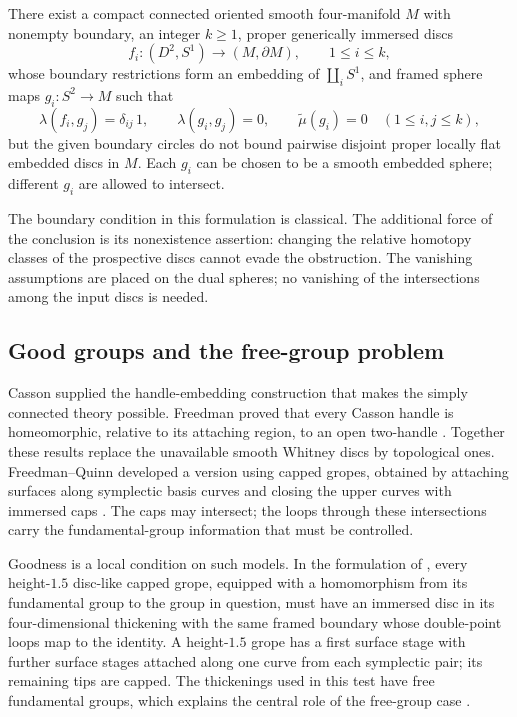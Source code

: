 \begin{theorem}\label{thm:main}
There exist a compact connected oriented smooth four-manifold $M$ with nonempty boundary, an integer $k\geq1$, proper generically immersed discs
\[
 f_i\colon(D^2,S^1)\longrightarrow(M,\partial M),\qquad 1\leq i\leq k,
\]
whose boundary restrictions form an embedding of $\coprod_iS^1$, and framed sphere maps $g_i\colon S^2\to M$ such that
\begin{equation}\label{eq:input-invariants}
 \lambda(f_i,g_j)=\delta_{ij}\,1,\qquad
 \lambda(g_i,g_j)=0,\qquad
 \widetilde\mu(g_i)=0
 \quad(1\leq i,j\leq k),
\end{equation}
but the given boundary circles do not bound pairwise disjoint proper locally flat embedded discs in $M$. Each $g_i$ can be chosen to be a smooth embedded sphere; different $g_i$ are allowed to intersect.
\end{theorem}

The boundary condition in this formulation is classical. The additional
force of the conclusion is its nonexistence assertion: changing the
relative homotopy classes of the prospective discs cannot evade the
obstruction. The vanishing assumptions are placed on the dual spheres;
no vanishing of the intersections among the input discs is needed.

\subsection{Good groups and the free-group problem}

Casson supplied the handle-embedding construction that makes the
simply connected theory possible. Freedman proved that every Casson
handle is homeomorphic, relative to its attaching region, to an open
two-handle \cite[Theorems~3.1 and~1.1]{Freedman1982}. Together these
results replace the unavailable smooth Whitney discs by topological
ones. Freedman--Quinn developed a version using capped gropes, obtained
by attaching surfaces along symplectic basis curves and closing the
upper curves with immersed caps \cite[Chapters~2--5]{FQ1990}.
The caps may intersect; the loops through these intersections carry
the fundamental-group information that must be controlled.

Goodness is a local condition on such models. In the formulation of
\cite[Definition~3.2]{PRT2025}, every height-$1.5$ disc-like capped
grope, equipped with a homomorphism from its fundamental group to the
group in question, must have an immersed disc in its four-dimensional
thickening with the same framed boundary whose double-point loops map
to the identity. A height-$1.5$ grope has a first surface stage with
further surface stages attached along one curve from each symplectic
pair; its remaining tips are capped.
The thickenings used in this test have free fundamental groups, which
explains the central role of the free-group case
\cite[pp.~510--511]{FT1995}.

